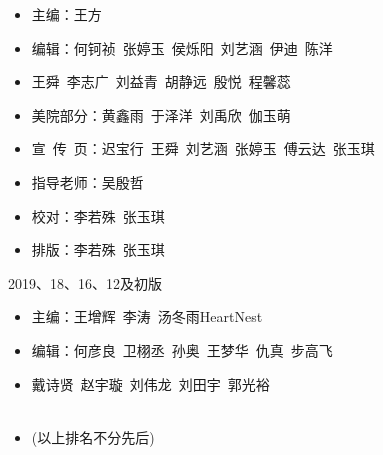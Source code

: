 \begin{titlepage}
\begin{itemize}
\item[] 主\qquad 编：王\quad 方
\item[] 编\qquad 辑：何钶祯\, 张婷玉\, 侯烁阳\, 刘艺涵\, 伊\quad 迪\, 陈\quad 洋
\item[] \hspace*{2.1cm}王\quad 舜\, 李志广\, 刘益青\, 胡静远\, 殷\quad 悦\, 程馨蕊
\item[] 美院部分：黄鑫雨\, 于泽洋\, 刘禹欣\, 伽玉萌
\item[] 宣\, 传\, 页：迟宝行\, 王\quad 舜\, 刘艺涵\, 张婷玉\, 傅云达\, 张玉琪
\item[] 指导老师：吴殷哲
\item[] 校\qquad 对：李若殊\, 张玉琪
\item[] 排\qquad 版：李若殊\, 张玉琪
\end{itemize}
\vspace{2cm}\centerline{2019、18、16、12及初版} 
\begin{itemize}

\item[] 主\qquad 编：王增辉\, 李\quad 涛\, 汤冬雨\hspace{0.3cm}HeartNest
\item[] 编\qquad 辑：何彦良\, 卫栩丞\, 孙\quad 奥\, 王梦华\, 仇\quad 真\, 步高飞
\item[] \hspace*{2.1cm}戴诗贤\, 赵宇璇\, 刘伟龙\, 刘田宇\, 郭光裕
\\
\\
\item[] (以上排名不分先后)
\end{itemize}



\clearpage{\pagestyle{empty}\cleardoublepage}%
\end{titlepage}


\clearpage{\pagestyle{empty}\cleardoublepage}

{
\hypersetup{linkcolor=black}
\tableofcontents                        %

}
\clearpage{\pagestyle{empty}\cleardoublepage}
